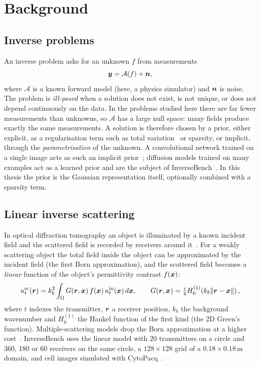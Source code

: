 \chapter{Background}
\label{ch:background}

\section{Inverse problems}
An inverse problem asks for an unknown $f$ from measurements
\begin{equation}
  \bm{y} = \mathcal{A}(f) + \bm{n},
\end{equation}
where $\mathcal{A}$ is a known forward model (here, a physics simulator) and $\bm{n}$ is noise. The problem is
\emph{ill-posed} when a solution does not exist, is not unique, or does not depend continuously on the data. In the
problems studied here there are far fewer measurements than unknowns, so $\mathcal{A}$ has a large null space: many
fields produce exactly the same measurements. A solution is therefore chosen by a prior, either explicit, as a
regularisation term such as total variation~\citep{rudin1992tv} or sparsity, or implicit, through the
\emph{parametrisation} of the unknown. A convolutional network trained on a single image acts as such an implicit
prior~\citep{ulyanov2018dip}; diffusion models trained on many examples act as a learned prior and are the subject of
InverseBench~\citep{zheng2025inversebench,chung2023dps}. In this thesis the prior is the Gaussian representation
itself, optionally combined with a sparsity term.

\section{Linear inverse scattering}
In optical diffraction tomography an object is illuminated by a known incident field and the scattered field is
recorded by receivers around it~\citep{bornwolf1999}. For a weakly scattering object the total field inside the object
can be approximated by the incident field (the first Born approximation), and the scattered field becomes a
\emph{linear} function of the object's permittivity contrast $f(\bm{x})$:
\begin{equation}
  u^{\mathrm{sc}}_t(\bm{r}) = k_b^2 \int_\Omega G(\bm{r},\bm{x})\, f(\bm{x})\, u^{\mathrm{in}}_t(\bm{x})\, d\bm{x},
  \qquad G(\bm{r},\bm{x}) = \tfrac{i}{4} H_0^{(1)}\!\left(k_b \lVert \bm{r}-\bm{x}\rVert\right),
\end{equation}
where $t$ indexes the transmitter, $\bm{r}$ a receiver position, $k_b$ the background wavenumber and $H_0^{(1)}$
the Hankel function of the first kind (the 2D Green's function). Multiple-scattering models drop the Born
approximation at a higher cost~\citep{sun2018multiplescattering}. InverseBench uses the linear model with 20
transmitters on a circle and 360, 180 or 60 receivers on the same circle, a $128\times128$ grid of a
$0.18\times0.18$\,m domain, and cell images simulated with CytoPacq~\citep{wiesner2019cytopacq}.

